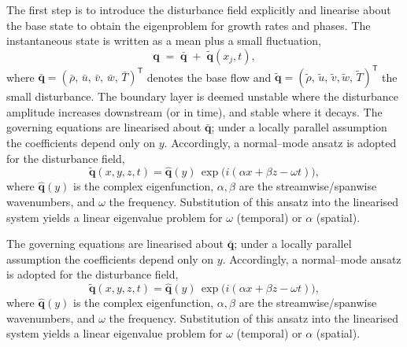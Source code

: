 The first step is to introduce the disturbance field explicitly and linearise about the base state to obtain the eigenproblem for growth rates and phases. The instantaneous state is written as a mean plus a small fluctuation,
\begin{equation}
  \boldsymbol{q} \;=\; \bar{\boldsymbol{q}}\;+\; \tilde{\boldsymbol{q}}(x_j,t),
\end{equation} 
where \(\bar{\boldsymbol{q}}=(\bar{\rho},\,\bar{u},\,\bar{v},\,\bar{w},\,\bar{T})^{\mathsf{T}}\) denotes the base flow and \(\tilde{\boldsymbol{q}}=(\tilde{\rho},\,\tilde{u},\,\tilde{v},\tilde{w},\,\tilde{T})^{\mathsf{T}}\) the small disturbance. The boundary layer is deemed unstable where the disturbance amplitude increases downstream (or in time), and stable where it decays. The governing equations are linearised about \(\bar{\boldsymbol{q}}\); under a locally parallel assumption the coefficients depend only on \(y\).
Accordingly, a normal–mode ansatz is adopted for the disturbance field,
\begin{equation}
  \tilde{\boldsymbol{q}}(x,y,z,t)
  = \hat{\boldsymbol{q}}(y)\,\exp\!\big(i(\alpha x+\beta z-\omega t)\big),
\end{equation}
where \(\hat{\boldsymbol{q}}(y)\) is the complex eigenfunction, \(\alpha,\beta\) are the streamwise/spanwise wavenumbers, and \(\omega\) the frequency.
Substitution of this ansatz into the linearised system yields a linear eigenvalue problem for \(\omega\) (temporal) or \(\alpha\) (spatial).



The governing equations are linearised about \(\bar{\boldsymbol{q}}\); under a locally parallel assumption the coefficients depend only on \(y\).
Accordingly, a normal–mode ansatz is adopted for the disturbance field,
\begin{equation}
  \tilde{\boldsymbol{q}}(x,y,z,t)
  = \hat{\boldsymbol{q}}(y)\,\exp\!\big(i(\alpha x+\beta z-\omega t)\big),
\end{equation}
where \(\hat{\boldsymbol{q}}(y)\) is the complex eigenfunction, \(\alpha,\beta\) are the streamwise/spanwise wavenumbers, and \(\omega\) the frequency.
Substitution of this ansatz into the linearised system yields a linear eigenvalue problem for \(\omega\) (temporal) or \(\alpha\) (spatial).

